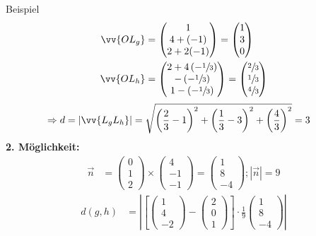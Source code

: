\documentclass{article}
\begin{document}
\begin{boxx}[DarkBlue]{Beispiel}
\begin{align*}
        \vv{OL_g} &= \begin{pmatrix}1\\4+(-1)\\2+2(-1)\end{pmatrix} = \begin{pmatrix}1\\3\\0\end{pmatrix}\\
        \vv{OL_h} &= \begin{pmatrix}2+4\left(-\sfrac{1}{3}\right)\\-\left(-\sfrac{1}{3}\right)\\1-\left(-\sfrac{1}{3}\right)\end{pmatrix} = \begin{pmatrix}\sfrac{2}{3}\\\sfrac{1}{3}\\\sfrac{4}{3}\end{pmatrix}
    \end{align*}
    \begin{align*}
        \Rightarrow d &= |\vv{L_gL_h}| = \sqrt{\left(\frac{2}{3}-1\right)^2+ \left(\frac{1}{3}-3\right)^2 + \left(\frac{4}{3}\right)^2} = 3
    \end{align*}
    \textbf{2. Möglichkeit:}
    \begin{align*}
        \vec{n} &= \begin{pmatrix}0\\1\\2\end{pmatrix} \times \begin{pmatrix}4\\-1\\-1\end{pmatrix} = \begin{pmatrix}1\\8\\-4\end{pmatrix}; |\vec{n}| = 9
    \end{align*}
    \begin{align*}
        d(g,h) &= \left|\left[\begin{pmatrix}1\\4\\-2\end{pmatrix}- \begin{pmatrix}2\\0\\1\end{pmatrix}\right] \cdot \frac{1}{9} \begin{pmatrix}1\\8\\-4\end{pmatrix}\right| \\

\end{align*}
\end{boxx}
\end{document}
